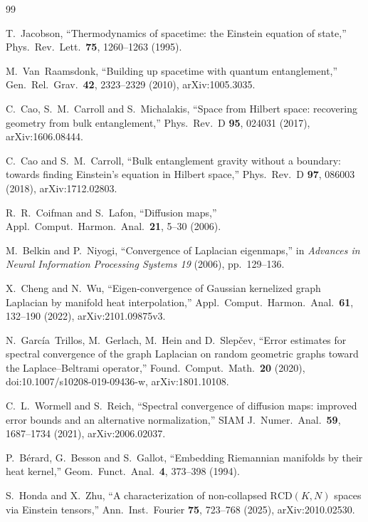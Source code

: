 \documentclass[11pt,a4paper]{article}
\theoremstyle{stmt}
\theoremstyle{defn}
\theoremstyle{rmk}
\numberwithin{equation}{section}
\begin{document}
{\begin{thebibliography}{99}
\setlength{\itemsep}{0.25ex}\setlength{\parskip}{0pt}

 T.~Jacobson, ``Thermodynamics of spacetime: the Einstein equation of state,'' Phys.\ Rev.\ Lett.\ \textbf{75}, 1260--1263 (1995).

 M.~Van~Raamsdonk, ``Building up spacetime with quantum entanglement,'' Gen.\ Rel.\ Grav.\ \textbf{42}, 2323--2329 (2010), arXiv:1005.3035.

 C.~Cao, S.~M.~Carroll and S.~Michalakis, ``Space from Hilbert space: recovering geometry from bulk entanglement,'' Phys.\ Rev.\ D \textbf{95}, 024031 (2017), arXiv:1606.08444.

 C.~Cao and S.~M.~Carroll, ``Bulk entanglement gravity without a boundary: towards finding Einstein's equation in Hilbert space,'' Phys.\ Rev.\ D \textbf{97}, 086003 (2018), arXiv:1712.02803.

 R.~R.~Coifman and S.~Lafon, ``Diffusion maps,'' Appl.\ Comput.\ Harmon.\ Anal.\ \textbf{21}, 5--30 (2006).

 M.~Belkin and P.~Niyogi, ``Convergence of Laplacian eigenmaps,'' in \emph{Advances in Neural Information Processing Systems 19} (2006), pp.~129--136.

 X.~Cheng and N.~Wu, ``Eigen-convergence of Gaussian kernelized graph Laplacian by manifold heat interpolation,'' Appl.\ Comput.\ Harmon.\ Anal.\ \textbf{61}, 132--190 (2022), arXiv:2101.09875v3.

 N.~Garc\'ia~Trillos, M.~Gerlach, M.~Hein and D.~Slep\v{c}ev, ``Error estimates for spectral convergence of the graph Laplacian on random geometric graphs toward the Laplace--Beltrami operator,'' Found.\ Comput.\ Math.\ \textbf{20} (2020), doi:10.1007/s10208-019-09436-w, arXiv:1801.10108.

 C.~L.~Wormell and S.~Reich, ``Spectral convergence of diffusion maps: improved error bounds and an alternative normalization,'' SIAM J.\ Numer.\ Anal.\ \textbf{59}, 1687--1734 (2021), arXiv:2006.02037.

 P.~B\'erard, G.~Besson and S.~Gallot, ``Embedding Riemannian manifolds by their heat kernel,'' Geom.\ Funct.\ Anal.\ \textbf{4}, 373--398 (1994).

 S.~Honda and X.~Zhu, ``A characterization of non-collapsed $\mathrm{RCD}(K,N)$ spaces via Einstein tensors,'' Ann.\ Inst.\ Fourier \textbf{75}, 723--768 (2025), arXiv:2010.02530.


\end{thebibliography}}
\end{document}
